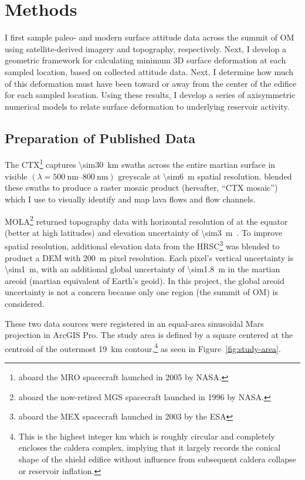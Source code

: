 \chapter{Methods}\label{cha:methods}

I first sample paleo- and modern surface attitude data across the summit of \acl{OM} using satellite-derived imagery and topography, respectively. Next, I develop a geometric framework for calculating minimum 3D surface deformation at each sampled location, based on collected attitude data. Next, I determine how much of this deformation must have been toward or away from the center of the edifice for each sampled location. Using these results, I develop a series of axisymmetric numerical models to relate surface deformation to underlying reservoir activity.

\section{Preparation of Published Data}
The \ac{CTX}\footnote{aboard the \ac{MRO} spacecraft launched in 2005 by \acs{NASA}.} captures \qty{\sim30}{\km} swaths across the entire martian surface in visible $(\lambda=\qtyrange{500}{800}{\nm})$ greyscale at \qty{\sim6}{\m} spatial resolution. \textcite{Dickson2018AGB} blended these swaths to produce a raster mosaic product (hereafter, ``\ac{CTX} mosaic'') which I use to visually identify and map lava flows and flow channels. %

\ac{MOLA}\footnote{aboard the now-retired \ac{MGS} spacecraft launched in 1996 by \acs{NASA}.} returned topography data with horizontal resolution of  at the equator (better at high latitudes) and elevation uncertainty of \qty{\sim3}{\m}~\parencite{smith_mars_2001}. To improve spatial resolution, additional elevation data from the \ac{HRSC}\footnote{aboard the \ac{MEX} spacecraft launched in 2003 by the \ac{ESA}} was blended to product a \ac{DEM} with \qty{200}{\m} pixel resolution. Each pixel's vertical uncertainty is \qty{\sim1}{\m}, with an additional global uncertainty of \qty{\sim1.8}{\m} in the martian areoid (martian equivalent of Earth's geoid). In this project, the global areoid uncertainty is not a concern because only one region (the summit of \ac{OM}) is considered.

These two data sources were registered in an equal-area sinusoidal Mars projection in ArcGIS Pro. The study area is defined by a square  centered at the centroid of the outermost \qty{19}{\km} contour,\footnote{This is the highest integer \unit{km} which is roughly circular and completely encloses the caldera complex, implying that it largely records the conical shape of the shield edifice without influence from subsequent caldera collapse or reservoir inflation.} as seen in Figure~\ref{fig:study-area}.

